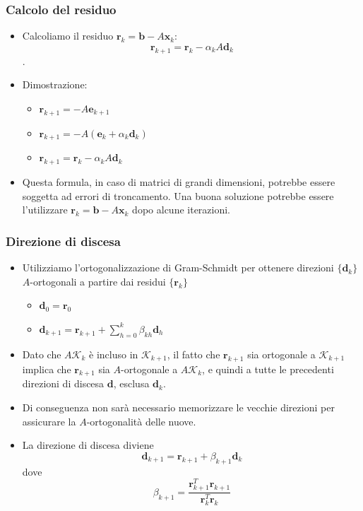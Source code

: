 \documentclass[10pt]{beamer}
\begin{document}
\begin{frame} \frametitle{Calcolo del residuo}
\begin{itemize}

\item Calcoliamo il \alert{residuo} $\mathbf{r}_k =\mathbf{b}-A\mathbf{x}_k$:
$$\mathbf{r}_{k+1}=\mathbf{r}_k-\alpha_kA\mathbf{d}_{k}$$ .

\item Dimostrazione:
\begin{itemize}
    \item $\mathbf{r}_{k+1}=-A\mathbf{e}_{k+1}$
    \item $\mathbf{r}_{k+1}=-A\left(\mathbf{e}_k+\alpha_k\mathbf{d}_k \right)$
    \item $\mathbf{r}_{k+1}=\mathbf{r}_k-\alpha_kA\mathbf{d}_{k}$
    
    \end{itemize}

\item Questa formula, in caso di matrici di grandi dimensioni, potrebbe essere soggetta ad errori di troncamento. Una buona soluzione potrebbe essere l'utilizzare $\mathbf{r}_k =\mathbf{b}-A\mathbf{x}_k$ dopo alcune iterazioni.
\end{itemize}
\end{frame}

\begin{frame} \frametitle{Direzione di discesa}
\begin{itemize}
\item Utilizziamo l'\alert{ortogonalizzazione di Gram-Schmidt} per ottenere direzioni $\{\mathbf{d}_k\}$ $A$-ortogonali a partire dai residui $\{\mathbf{r}_k\}$
\begin{itemize}
\item $\mathbf{d}_0=\mathbf{r}_0$
\item $\mathbf{d}_{k+1}=\mathbf{r}_{k+1}+\sum_{h=0}^k\beta_{kh}\mathbf{d}_h$
\end{itemize}
\item Dato che $A\mathcal{K}_k$ è incluso in $\mathcal{K}_{k+1}$, il fatto che $\mathbf{r}_{k+1}$ sia ortogonale a $\mathcal{K}_{k+1}$ implica che $\mathbf{r}_{k+1}$ sia $A$-ortogonale a $A\mathcal{K}_k$, e quindi a tutte le precedenti direzioni di discesa $\mathbf{d}$, esclusa $\mathbf{d}_k$. 
\item Di conseguenza \alert{non sarà necessario memorizzare le vecchie direzioni} per assicurare la $A$-ortogonalità delle nuove.
\item La \alert{direzione di discesa} diviene
$$
\mathbf{d}_{k+1}=\mathbf{r}_{k+1}+\beta_{k+1}\mathbf{d}_k
$$
dove
$$
\beta_{k+1}=\frac{\mathbf{r}_{k+1}^T\mathbf{r}_{k+1}}{\mathbf{r}_{k}^T\mathbf{r}_{k}}
$$
\end{itemize}
\end{frame}
\end{document}
